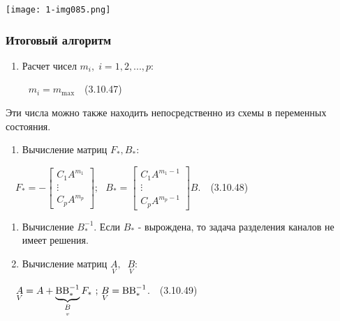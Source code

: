 \documentclass[a4paper]{article}
\newcounter{saveenum}
\newcommand\liststyleWWviiiNumxxxi{%
\renewcommand\theenumi{\arabic{enumi}}
\renewcommand\theenumii{\arabic{enumii}}
\renewcommand\theenumiii{\arabic{enumiii}}
\renewcommand\theenumiv{\arabic{enumiv}}
\renewcommand\labelenumi{\theenumi.}
\renewcommand\labelenumii{\theenumii.}
\renewcommand\labelenumiii{\theenumiii.}
\renewcommand\labelenumiv{\theenumiv.}
}
\newcommand\normalsubformula[1]{\text{\mathversion{normal}$#1$}}
\begin{document}
{\centering  \texttt{[image: 1-img085.png]} \par}
\subsubsection[Итоговый алгоритм\ \ ]{Итоговый алгоритм\ \ }
\hypertarget{RefHeadingToc455659748}{}\liststyleWWviiiNumxxxi
\begin{enumerate}
\item {\begin{russian}\sffamily
Расчет чисел  $m_i,\;i=1,2,...,p$:
\end{russian}}
\end{enumerate}
{\begin{russian}\sffamily
\ \ \textenglish{\ \ } $m_i=m_{\text{max}}$\ \ (3.10.47)
\end{russian}}

{\begin{russian}\sffamily
Эти числа можно также находить непосредственно из схемы в переменных состояния.
\end{russian}}

\liststyleWWviiiNumxxxi
\setcounter{saveenum}{\value{enumi}}
\begin{enumerate}
\setcounter{enumi}{\value{saveenum}}
\item {\begin{russian}\sffamily
Вычисление матриц  $F_{\ast },B_{\ast }$:
\end{russian}}
\end{enumerate}
{\begin{russian}\sffamily
\ \  $F_{\ast }=-\left[\begin{matrix}C_1A^{m_1}\\\vdots \\C_pA^{m_p}\end{matrix}\right];\text{  }B_{\ast
}=\left[\begin{matrix}C_1A^{m_1-1}\\\vdots \\C_pA^{m_p-1}\end{matrix}\right]B.$\ \ (3.10.48)
\end{russian}}

\liststyleWWviiiNumxxxi
\setcounter{saveenum}{\value{enumi}}
\begin{enumerate}
\setcounter{enumi}{\value{saveenum}}
\item {\begin{russian}\sffamily
Вычисление  $B_{\ast }^{-1}$. Если  $B_{\ast }$ - вырождена, то задача разделения каналов не имеет решения.
\end{russian}}
\item {\begin{russian}\sffamily
Вычисление матриц  $\underset V{A},\;\;\underset V{B}$:
\end{russian}}
\end{enumerate}
{\begin{russian}\sffamily
\ \  $\underset V{A}=A+\underbrace{\normalsubformula{\text{BB}}_{\ast }^{-1}}_{\underset v{B}}F_{\ast }\text{ ; 
}\underset V{B}=\normalsubformula{\text{BB}}_{\ast }^{-1}$.\ \ (3.10.49)
\end{russian}}
\end{document}
